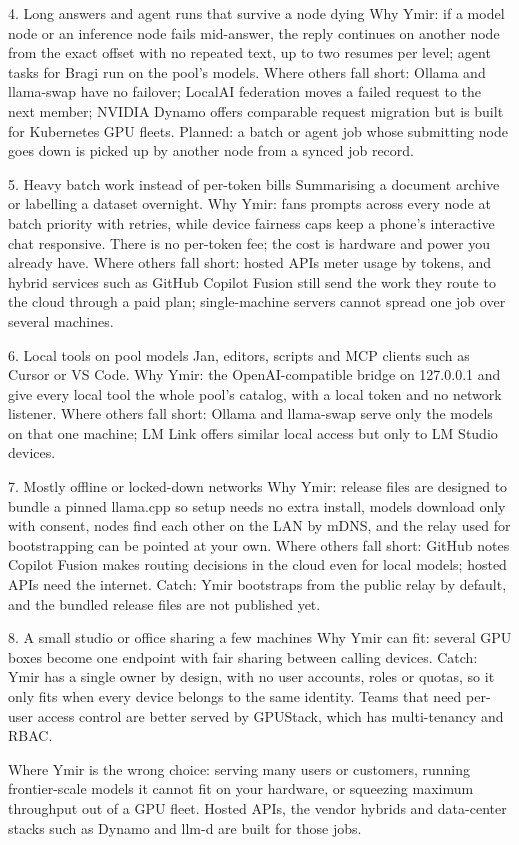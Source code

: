 \begin{rowlist}
  \item[4. Long answers and agent runs that survive a node dying \status{Built (job hand-off planned)}]
  Why Ymir: if a model node or an inference node fails mid-answer, the reply continues on another node from the exact offset with no repeated text, up to two resumes per level; agent tasks for Bragi run on the pool's models. Where others fall short: Ollama and llama-swap have no failover; LocalAI federation moves a failed request to the next member; NVIDIA Dynamo offers comparable request migration but is built for Kubernetes GPU fleets. Planned: a batch or agent job whose submitting node goes down is picked up by another node from a synced job record.

  \item[5. Heavy batch work instead of per-token bills \status{Built}]
  Summarising a document archive or labelling a dataset overnight. Why Ymir:  fans prompts across every node at batch priority with retries, while device fairness caps keep a phone's interactive chat responsive. There is no per-token fee; the cost is hardware and power you already have. Where others fall short: hosted APIs meter usage by tokens, and hybrid services such as GitHub Copilot Fusion still send the work they route to the cloud through a paid plan; single-machine servers cannot spread one job over several machines.

  \item[6. Local tools on pool models \status{Built}]
  Jan, editors, scripts and MCP clients such as Cursor or VS Code. Why Ymir: the OpenAI-compatible bridge on 127.0.0.1 and  give every local tool the whole pool's catalog, with a local token and no network listener. Where others fall short: Ollama and llama-swap serve only the models on that one machine; LM Link offers similar local access but only to LM Studio devices.

  \item[7. Mostly offline or locked-down networks \status{Built, release pending}]
  Why Ymir: release files are designed to bundle a pinned llama.cpp so setup needs no extra install, models download only with consent, nodes find each other on the LAN by mDNS, and the relay used for bootstrapping can be pointed at your own. Where others fall short: GitHub notes Copilot Fusion makes routing decisions in the cloud even for local models; hosted APIs need the internet. Catch: Ymir bootstraps from the public relay by default, and the bundled release files are not published yet.

  \item[8. A small studio or office sharing a few machines \status{Fits with limits}]
  Why Ymir can fit: several GPU boxes become one endpoint with fair sharing between calling devices. Catch: Ymir has a single owner by design, with no user accounts, roles or quotas, so it only fits when every device belongs to the same identity. Teams that need per-user access control are better served by GPUStack, which has multi-tenancy and RBAC.
\end{rowlist}

Where Ymir is the wrong choice: serving many users or customers, running frontier-scale models it
cannot fit on your hardware, or squeezing maximum throughput out of a GPU fleet. Hosted APIs, the
vendor hybrids and data-center stacks such as Dynamo and llm-d are built for those jobs.
